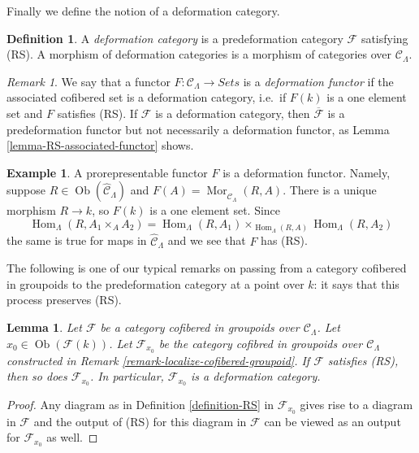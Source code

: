 \documentclass{stacks-project}
\theoremstyle{plain}
\newtheorem{lemma}[subsection]{Lemma}
\theoremstyle{definition}
\newtheorem{definition}[subsection]{Definition}
\newtheorem{example}[subsection]{Example}
\theoremstyle{remark}
\newtheorem{remark}[subsection]{Remark}
\numberwithin{equation}{subsection}
\def\Hom{\mathop{\mathrm{Hom}}\nolimits}
\def\Mor{\mathop{\mathrm{Mor}}\nolimits}
\def\Ob{\mathop{\mathrm{Ob}}\nolimits}
\begin{document}
\noindent
Finally we define the notion of a deformation category.

\begin{definition}
\label{definition-deformation-category}
A {\it deformation category} is a predeformation category $\mathcal{F}$
satisfying (RS). A morphism of deformation categories is a morphism of
categories over $\mathcal{C}_\Lambda$.
\end{definition}

\begin{remark}
\label{remark-deformation-functor}
We say that a functor $F: \mathcal{C}_\Lambda \to \textit{Sets}$
is a {\it deformation functor} if the associated cofibered set is a
deformation category, i.e.\ if $F(k)$ is a one element set and $F$ satisfies
(RS). If $\mathcal{F}$ is a deformation category, then
$\overline{\mathcal{F}}$
is a predeformation functor but not necessarily a deformation functor, as
Lemma \ref{lemma-RS-associated-functor} shows.
\end{remark}

\begin{example}
\label{example-prorepresentable-deformation-functor}
A prorepresentable functor $F$ is a deformation functor. Namely, suppose
$R \in \Ob(\widehat{\mathcal{C}}_\Lambda)$ and
$F(A) = \Mor_{\widehat{\mathcal{C}}_\Lambda}(R, A)$.
There is a unique morphism $R \to k$, so $F(k)$ is a one element set.
Since
$$
\Hom_\Lambda(R, A_1 \times_A A_2) =
\Hom_\Lambda(R, A_1) \times_{\Hom_\Lambda(R, A)}
\Hom_\Lambda(R, A_2)
$$
the same is true for maps in $\widehat{\mathcal{C}}_\Lambda$ and
we see that $F$ has (RS).
\end{example}

\noindent
The following is one of our typical remarks on passing from a category
cofibered in groupoids to the predeformation category at a point over $k$: it
says that this process preserves (RS).

\begin{lemma}
\label{lemma-localize-RS}
Let $\mathcal{F}$ be a category cofibered in groupoids over
$\mathcal{C}_\Lambda$. Let $x_0 \in \Ob(\mathcal{F}(k))$.
Let $\mathcal{F}_{x_0}$ be the category cofibred in groupoids over
$\mathcal{C}_\Lambda$ constructed in
Remark \ref{remark-localize-cofibered-groupoid}.
If $\mathcal{F}$ satisfies (RS), then so does $\mathcal{F}_{x_0}$.
In particular, $\mathcal{F}_{x_0}$ is a deformation category.
\end{lemma}

\begin{proof}
Any diagram as in
Definition \ref{definition-RS}
in $\mathcal{F}_{x_0}$ gives rise to a diagram in $\mathcal{F}$
and the output of (RS) for this diagram in $\mathcal{F}$
can be viewed as an output for $\mathcal{F}_{x_0}$ as well.
\end{proof}
\end{document}
